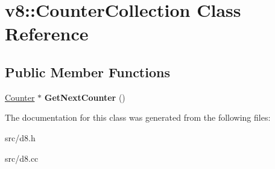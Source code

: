 \hypertarget{classv8_1_1_counter_collection}{}\section{v8\+:\+:Counter\+Collection Class Reference}
\label{classv8_1_1_counter_collection}
\subsection*{Public Member Functions}
\begin{DoxyCompactItemize}
\item 
\hypertarget{classv8_1_1_counter_collection_a8233c61ab7e4db3d340be7ab7c1bbc1c}{}\hyperlink{classv8_1_1_counter}{Counter} $\ast$ {\bfseries Get\+Next\+Counter} ()\label{classv8_1_1_counter_collection_a8233c61ab7e4db3d340be7ab7c1bbc1c}

\end{DoxyCompactItemize}


The documentation for this class was generated from the following files\+:\begin{DoxyCompactItemize}
\item 
src/d8.\+h\item 
src/d8.\+cc\end{DoxyCompactItemize}
